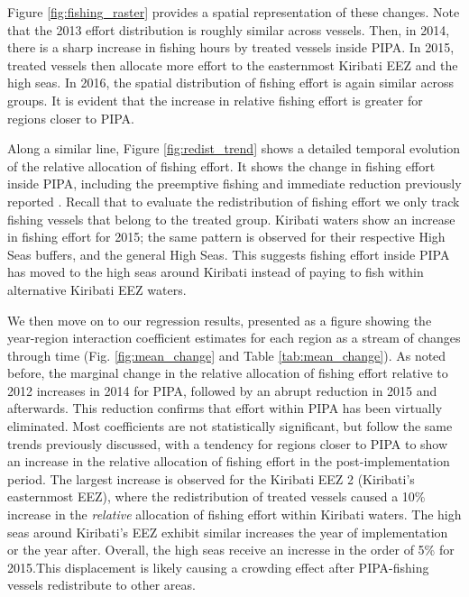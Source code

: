 \documentclass[9pt,twoside,lineno]{pnas-new}
\begin{document}

Figure \ref{fig:fishing_raster} provides a spatial representation of
these changes. Note that the 2013 effort distribution is roughly similar
across vessels. Then, in 2014, there is a sharp increase in fishing hours
by treated vessels inside PIPA. In 2015, treated vessels
then allocate more effort to the easternmost Kiribati EEZ and the high seas.
In 2016, the spatial distribution of
fishing effort is again similar across groups. It is evident that the
increase in relative fishing effort is greater for regions closer to
PIPA. 

Along a similar line, Figure \ref{fig:redist_trend} shows a detailed
temporal evolution of the relative allocation of fishing
effort.  It shows the change in fishing effort inside PIPA, including the
preemptive fishing and immediate reduction previously reported
\citep{mcdermott_2018}. Recall that to evaluate the redistribution of fishing effort
we only track fishing vessels that belong to the treated group.
Kiribati waters show an increase in fishing effort for 2015;
the same pattern is observed for their respective High Seas buffers,
and the general High Seas. This suggests fishing effort inside PIPA has moved to the
high seas around Kiribati instead of paying to fish within alternative Kiribati EEZ waters.

We then move on to our regression results, presented as a figure showing
the year-region interaction coefficient estimates for each region as a
stream of changes through time (Fig. \ref{fig:mean_change} and Table
\ref{tab:mean_change}). As noted before, the marginal change in the
relative allocation of fishing effort relative to 2012 increases in 2014
for PIPA, followed by an abrupt reduction in 2015 and afterwards. This 
reduction confirms that effort within PIPA has been virtually eliminated.
Most coefficients are not statistically significant, but
follow the same trends previously discussed, with a tendency for regions
closer to PIPA to show an increase in the relative allocation of fishing
effort in the post-implementation period. The largest increase is
observed for the Kiribati EEZ 2 (Kiribati's easternmost EEZ), where the
redistribution of treated vessels caused a 10\% increase in the \emph{relative} allocation of
fishing effort within Kiribati waters. The high seas around Kiribati's EEZ exhibit
similar increases the year of implementation or the year after. Overall, the high seas
receive an incresse in the order of 5\% for 2015.This displacement is likely
causing a crowding effect after PIPA-fishing vessels redistribute to
other areas.
\end{document}
